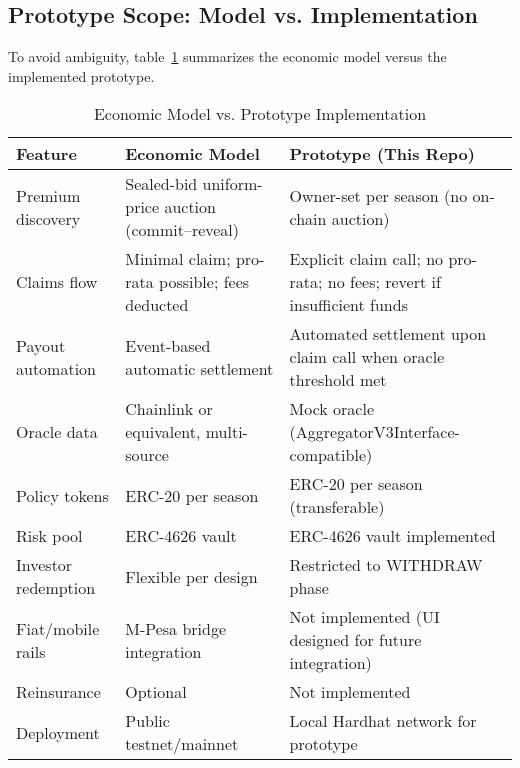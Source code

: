 \documentclass[11pt,a4paper]{article}
\begin{document}
		\subsection{Prototype Scope: Model vs. Implementation}\label{subsec:model-vs-prototype}
		To avoid ambiguity, table~\ref{tab:model-vs-prototype} summarizes the economic model versus the implemented prototype.
		\begin{table}[!h]
		\centering
		\caption{Economic Model vs. Prototype Implementation}
		\label{tab:model-vs-prototype}
		\begin{tabular}{|>{\raggedright\arraybackslash}p{}|>{\raggedright\arraybackslash}p{}|>{\raggedright\arraybackslash}p{}|}
		\hline
		\textbf{Feature} & \textbf{Economic Model} & \textbf{Prototype (This Repo)} \\
		\hline
		Premium discovery & Sealed-bid uniform-price auction (commit--reveal) & Owner-set per season (no on-chain auction) \\
		\hline
		Claims flow & Minimal claim; pro-rata possible; fees deducted & Explicit claim call; no pro-rata; no fees; revert if insufficient funds \\
		\hline
		Payout automation & Event-based automatic settlement & Automated settlement upon claim call when oracle threshold met \\
		\hline
		Oracle data & Chainlink or equivalent, multi-source & Mock oracle (AggregatorV3Interface-compatible) \\
		\hline
		Policy tokens & ERC-20 per season & ERC-20 per season (transferable) \\
		\hline
		Risk pool & ERC-4626 vault & ERC-4626 vault implemented \\
		\hline
		Investor redemption & Flexible per design & Restricted to WITHDRAW phase \\
		\hline
		Fiat/mobile rails & M-Pesa bridge integration & Not implemented (UI designed for future integration) \\
		\hline
		Reinsurance & Optional & Not implemented \\
		\hline
		Deployment & Public testnet/mainnet & Local Hardhat network\footnotemark{} for prototype \\
		\hline
		\end{tabular}
		\end{table}

\end{document}
